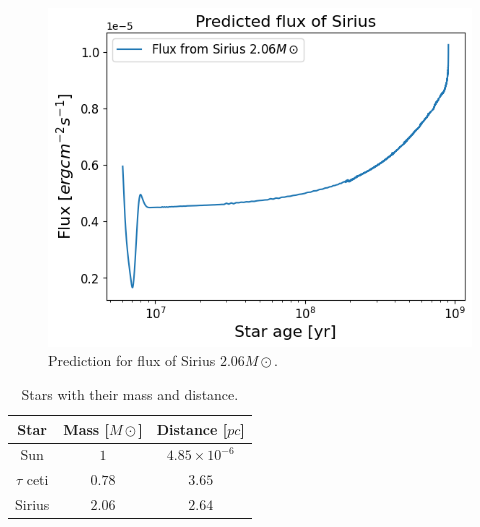 \begin{figure}[H]
	\centering
	\includegraphics[width=\textwidth,height=0.35\textheight]{assets/fluxsirius.png}
	\caption{Prediction for flux of Sirius $2.06 M\odot$.}
	\label{fig:predicted flux sirius}
\end{figure}

\begin{table}[H]
    \centering
	\caption{Stars with their mass and distance.}
	\label{tab:stars and mass}
	\begin{tabular}{ccc}
		\toprule
		Star & Mass [$M\odot$]  & Distance [$pc$] \\
		\midrule
		Sun & $1$ & $4.85\times 10^{-6}$\\
		$\tau$ ceti & $0.78$ & $3.65$\\
		Sirius & $2.06$ & $2.64 $\\
		\bottomrule
	\end{tabular}
\end{table}

